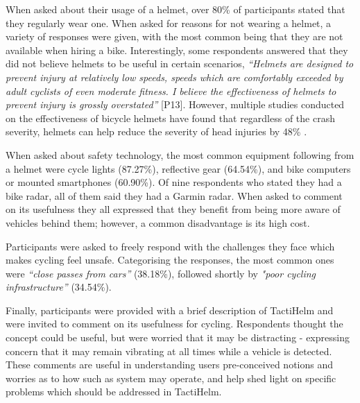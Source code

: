 \documentclass{interim}
\begin{document}
When asked about their usage of a helmet, over 80\% of participants stated that they regularly wear one. When asked for reasons for not wearing a helmet, a variety of responses were given, with the most common being that they are not available when hiring a bike. Interestingly, some respondents answered that they did not believe helmets to be useful in certain scenarios, \textit{“Helmets are designed to prevent injury at relatively low speeds, speeds which are comfortably exceeded by adult cyclists of even moderate fitness. I believe the effectiveness of helmets to prevent injury is grossly overstated”} [P13]. However, multiple studies conducted on the effectiveness of bicycle helmets \cite{10.1093/ije/dyw153, HOYE201885, HOYE2018239, buth2023effectiveness} have found that regardless of the crash severity, helmets can help reduce the severity of head injuries by 48\% \cite{HOYE201885}.

When asked about safety technology, the most common equipment following from a helmet were cycle lights (87.27\%), reflective gear (64.54\%), and bike computers or mounted smartphones (60.90\%). Of nine respondents who stated they had a bike radar, all of them said they had a Garmin radar. When asked to comment on its usefulness they all expressed that they benefit from being more aware of vehicles behind them; however, a common disadvantage is its high cost.

Participants were asked to freely respond with the challenges they face which makes cycling feel unsafe. Categorising the responses, the most common ones were \textit{“close passes from cars”} (38.18\%), followed shortly by \textit{"poor cycling infrastructure”} (34.54\%).

Finally, participants were provided with a brief description of TactiHelm and were invited to comment on its usefulness for cycling. Respondents thought the concept could be useful, but were worried that it may be distracting - expressing concern that it may remain vibrating at all times while a vehicle is detected. These comments are useful in understanding users pre-conceived notions and worries as to how such as system may operate, and help shed light on specific problems which should be addressed in TactiHelm.
\end{document}
